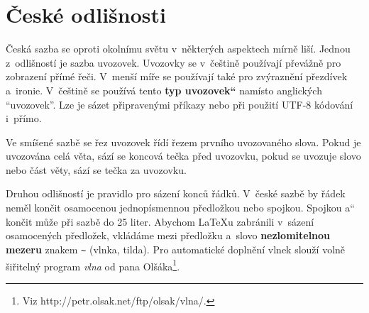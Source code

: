 \documentclass[11pt,a4paper,twocolumn]{article}
\newcommand{\myuv}[1]{\quotedblbase #1\textquotedblleft}
\begin{document}
\section{České odlišnosti}
Česká sazba se oproti okolnímu světu v~některých aspektech mírně liší. Jednou z~odlišností je sazba uvozovek. Uvozovky se v~češtině používají převážně pro zobrazení přímé řeči. V~menší míře se používají také pro zvýraznění přezdívek a~ironie. V~češtině se používá tento \textbf{\myuv{typ uvozovek}} namísto anglických ``uvozovek''. Lze je sázet připravenými příkazy nebo při použití UTF-8 kódování i~přímo.\par
Ve smíšené sazbě se řez uvozovek řídí řezem prv\-ního uvozovaného slova. Pokud je uvozována celá věta, sází se koncová tečka před uvozovku, pokud se uvozuje slovo nebo část věty, sází se tečka za uvozovku.\par
Druhou odlišností je pravidlo pro sázení konců řádků. V~české sazbě by řádek neměl končit osamocenou jednopísmennou předložkou nebo spojkou. Spojkou \myuv{a} končit může při sazbě do 25 liter. Abychom \LaTeX{}u zabránili v~sázení osamocených předložek, vkládáme mezi předložku a~slovo \textbf{nezlomitelnou mezeru} znakem \verb|~| (vlnka, tilda). Pro automatické do\-plnění vlnek slouží volně šiřitelný program \emph{vlna} od pana Olšáka\footnote{Viz http://petr.olsak.net/ftp/olsak/vlna/.}.
\end{document}
